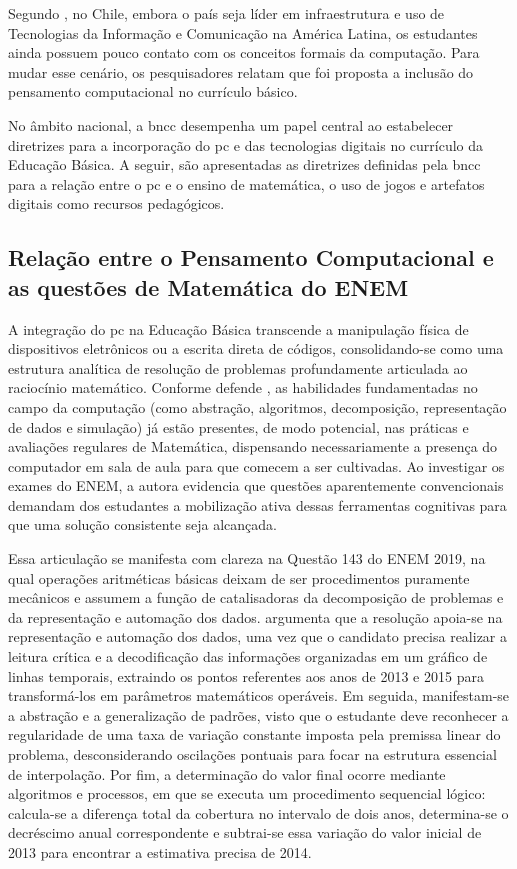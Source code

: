 Segundo , no Chile, embora o país seja líder em
infraestrutura e uso de Tecnologias da Informação e Comunicação na América
Latina, os estudantes ainda possuem pouco contato com os conceitos formais da
computação. Para mudar esse cenário, os pesquisadores relatam que foi proposta
a inclusão do pensamento computacional no currículo básico.

No âmbito nacional, a \gls{bncc} desempenha um papel
central ao estabelecer diretrizes para a incorporação do \gls{pc} e das tecnologias
digitais no currículo da Educação Básica. A seguir, são apresentadas as
diretrizes definidas pela \gls{bncc} para a relação entre o \gls{pc} e o ensino de
matemática, o uso de jogos e artefatos digitais como recursos pedagógicos.

\subsection{Relação entre o Pensamento Computacional e as questões de Matemática do ENEM}

A integração do \gls{pc} na Educação Básica
transcende a manipulação física de dispositivos eletrônicos ou a escrita direta
de códigos, consolidando-se como uma estrutura analítica de resolução de
problemas profundamente articulada ao raciocínio matemático. Conforme defende
, as habilidades fundamentadas no campo da computação (como
abstração, algoritmos, decomposição, representação de dados e simulação) já
estão presentes, de modo potencial, nas práticas e avaliações regulares de
Matemática, dispensando necessariamente a presença do computador em sala de aula
para que comecem a ser cultivadas. Ao investigar os exames do ENEM, a autora
evidencia que questões aparentemente convencionais demandam dos estudantes a
mobilização ativa dessas ferramentas cognitivas para que uma solução consistente
seja alcançada.

Essa articulação se manifesta com clareza na Questão 143
do ENEM 2019, na qual operações aritméticas básicas deixam de ser
procedimentos puramente mecânicos e assumem a função de catalisadoras da
decomposição de problemas e da representação e automação dos
dados.  argumenta que a resolução apoia-se na representação e automação dos dados, uma vez que o candidato precisa realizar a leitura crítica e a decodificação das informações organizadas em um gráfico de linhas temporais, extraindo os pontos referentes aos anos de 2013 e 2015 para transformá-los em parâmetros matemáticos operáveis. Em seguida, manifestam-se a abstração e a generalização de padrões, visto que o estudante deve reconhecer a regularidade de uma taxa de variação constante imposta pela premissa linear do problema, desconsiderando oscilações pontuais para focar na estrutura essencial de interpolação. Por fim, a determinação do valor final ocorre mediante algoritmos e processos, em que se executa um procedimento sequencial lógico: calcula-se a diferença total da cobertura no intervalo de dois anos, determina-se o decréscimo anual correspondente e subtrai-se essa variação do valor inicial de 2013 para encontrar a estimativa precisa de 2014.

